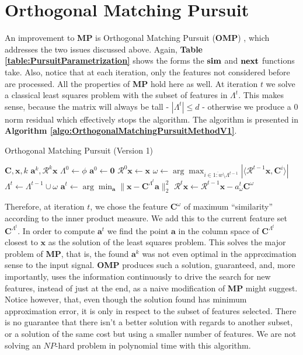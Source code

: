\documentclass[12pt,a4paper,oneside,english]{UPBThesis}
\newcommand{\hcrange}[2]{\overline{{#1}\colon\!\!{#2}}}
\begin{document}
\section{Orthogonal Matching Pursuit}
\label{ref:OrthogonalMatchingPursuit}

An improvement to \textbf{MP} is Orthogonal Matching Pursuit (\textbf{OMP}) \cite{matchingpursuit2,orthopursuit}, which addresses the two issues discussed above. Again, \textbf{Table \ref{table:PursuitParametrization}} shows the forms the $\text{\textbf{sim}}$ and $\text{\textbf{next}}$ functions take. Also, notice that at each iteration, only the features not considered before are processed. All the properties of \textbf{MP} hold here as well. At iteration $t$ we solve a classical least squares problem with the subset of features in $\Lambda^t$. This makes sense, because the matrix will always be tall - $\left| \Lambda^t \right| \leq d$ - otherwise we produce a $0$ norm residual which effectively stops the algorithm. The algorithm is presented in \textbf{Algorithm \ref{algo:OrthogonalMatchingPursuitMethodV1}}.

\begin{algorithm}
\caption{Orthogonal Matching Pursuit (Version 1)}
\label{algo:OrthogonalMatchingPursuitMethodV1}
\begin{algorithmic}
\Require $\textbf{C},\textbf{x},k$
\Ensure $\textbf{a}^k,\mathcal{R}^k\textbf{x}$
\State $\Lambda^0 \gets \phi$
\State $\textbf{a}^0 \gets \textbf{0}$
\State $\mathcal{R}^0\textbf{x} \gets \textbf{x}$
\For {$t = \hcrange{1}{k}$}
\State $\omega \gets \arg \max_{i \in \hcrange{1}{w} \setminus \Lambda^{t-1}} \left| \langle \mathcal{R}^{t-1}\textbf{x} , \textbf{C}^i \rangle \right|$
\State $\Lambda^t \gets \Lambda^{t-1} \cup \omega$
\State $\textbf{a}^t \gets \arg\min_{\textbf{a}} {\| \textbf{x} - \textbf{C}^{\Lambda^t}\textbf{a} \|_2^2}$
\State $\mathcal{R}^t\textbf{x} \gets \mathcal{R}^{t-1}\textbf{x} - a_\omega^t\textbf{C}^\omega$
\EndFor
\end{algorithmic}
\end{algorithm}

Therefore, at iteration $t$, we chose the feature $\textbf{C}^\omega$ of maximum ``similarity'' according to the inner product measure. We add this to the current feature set $\textbf{C}^{\Lambda^t}$. In order to compute $\textbf{a}^t$ we find the point $\textbf{a}$ in the column space of $\textbf{C}^{\Lambda^t}$ closest to $\textbf{x}$ as the solution of the least squares problem. This solves the major problem of \textbf{MP}, that is, the found $\textbf{a}^k$ was not even optimal in the approximation sense to the input signal. \textbf{OMP} produces such a solution, guaranteed, and, more importantly, uses the information continuously to drive the search for new features, instead of just at the end, as a naive modification of $\textbf{MP}$ might suggest. Notice however, that, even though the solution found has minimum approximation error, it is only in respect to the subset of features selected. There is no guarantee that there isn't a better solution with regards to another subset, or a solution of the same cost but using a smaller number of features. We are not solving an $NP$-hard problem in polynomial time with this algorithm.
\end{document}
